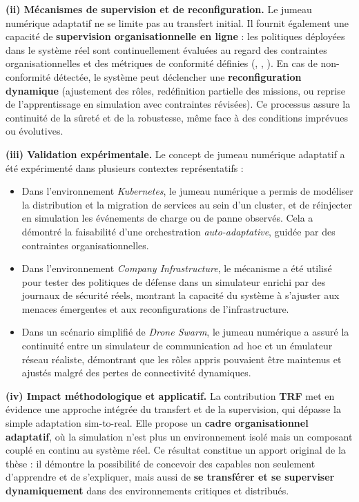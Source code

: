 \medskip
\noindent
\textbf{(ii) Mécanismes de supervision et de reconfiguration.}
Le jumeau numérique adaptatif ne se limite pas au transfert initial.
Il fournit également une capacité de \textbf{supervision organisationnelle en ligne} :
les politiques déployées dans le système réel sont continuellement évaluées au regard des contraintes organisationnelles et des métriques de conformité définies (, , ).
En cas de non-conformité détectée, le système peut déclencher une \textbf{reconfiguration dynamique} (ajustement des rôles, redéfinition partielle des missions, ou reprise de l'apprentissage en simulation avec contraintes révisées).
Ce processus assure la continuité de la sûreté et de la robustesse, même face à des conditions imprévues ou évolutives.

\medskip
\noindent
\textbf{(iii) Validation expérimentale.}
Le concept de jumeau numérique adaptatif a été expérimenté dans plusieurs contextes représentatifs :
\begin{itemize}
  \item Dans l'environnement \textit{Kubernetes}, le jumeau numérique a permis de modéliser la distribution et la migration de services au sein d'un cluster, et de réinjecter en simulation les événements de charge ou de panne observés. Cela a démontré la faisabilité d'une orchestration \textit{auto-adaptative}, guidée par des contraintes organisationnelles.
  \item Dans l'environnement \textit{Company Infrastructure}, le mécanisme a été utilisé pour tester des politiques de défense dans un simulateur enrichi par des journaux de sécurité réels, montrant la capacité du système à s'ajuster aux menaces émergentes et aux reconfigurations de l'infrastructure.
  \item Dans un scénario simplifié de \textit{Drone Swarm}, le jumeau numérique a assuré la continuité entre un simulateur de communication ad hoc et un émulateur réseau réaliste, démontrant que les rôles appris pouvaient être maintenus et ajustés malgré des pertes de connectivité dynamiques.
\end{itemize}

\medskip
\noindent
\textbf{(iv) Impact méthodologique et applicatif.}
La contribution \textbf{TRF} met en évidence une approche intégrée du transfert et de la supervision, qui dépasse la simple adaptation sim-to-real.
Elle propose un \textbf{cadre organisationnel adaptatif}, où la simulation n'est plus un environnement isolé mais un composant couplé en continu au système réel.
Ce résultat constitue un apport original de la thèse : il démontre la possibilité de concevoir des  capables non seulement d'apprendre et de s'expliquer, mais aussi de \textbf{se transférer et se superviser dynamiquement} dans des environnements critiques et distribués.

